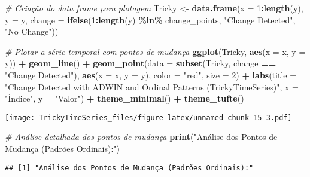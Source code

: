 \documentclass[
]{article}
\newenvironment{Shaded}{\begin{snugshade}}{\end{snugshade}}
\newcommand{\AttributeTok}[1]{\textcolor[rgb]{0.13,0.29,0.53}{#1}}
\newcommand{\CommentTok}[1]{\textcolor[rgb]{0.56,0.35,0.01}{\textit{#1}}}
\newcommand{\DecValTok}[1]{\textcolor[rgb]{0.00,0.00,0.81}{#1}}
\newcommand{\FunctionTok}[1]{\textcolor[rgb]{0.13,0.29,0.53}{\textbf{#1}}}
\newcommand{\NormalTok}[1]{#1}
\newcommand{\OtherTok}[1]{\textcolor[rgb]{0.56,0.35,0.01}{#1}}
\newcommand{\SpecialCharTok}[1]{\textcolor[rgb]{0.81,0.36,0.00}{\textbf{#1}}}
\newcommand{\StringTok}[1]{\textcolor[rgb]{0.31,0.60,0.02}{#1}}
\begin{document}
\begin{Shaded}
\begin{Highlighting}[]
\CommentTok{\# Criação do data frame para plotagem}
\NormalTok{Tricky }\OtherTok{\textless{}{-}} \FunctionTok{data.frame}\NormalTok{(}\AttributeTok{x =} \DecValTok{1}\SpecialCharTok{:}\FunctionTok{length}\NormalTok{(y), }\AttributeTok{y =}\NormalTok{ y, }\AttributeTok{change =} \FunctionTok{ifelse}\NormalTok{(}\DecValTok{1}\SpecialCharTok{:}\FunctionTok{length}\NormalTok{(y) }\SpecialCharTok{\%in\%}\NormalTok{ change\_points, }\StringTok{"Change Detected"}\NormalTok{, }\StringTok{"No Change"}\NormalTok{))}

\CommentTok{\# Plotar a série temporal com pontos de mudança}
\FunctionTok{ggplot}\NormalTok{(Tricky, }\FunctionTok{aes}\NormalTok{(}\AttributeTok{x =}\NormalTok{ x, }\AttributeTok{y =}\NormalTok{ y)) }\SpecialCharTok{+}
  \FunctionTok{geom\_line}\NormalTok{() }\SpecialCharTok{+}
  \FunctionTok{geom\_point}\NormalTok{(}\AttributeTok{data =} \FunctionTok{subset}\NormalTok{(Tricky, change }\SpecialCharTok{==} \StringTok{"Change Detected"}\NormalTok{), }\FunctionTok{aes}\NormalTok{(}\AttributeTok{x =}\NormalTok{ x, }\AttributeTok{y =}\NormalTok{ y), }\AttributeTok{color =} \StringTok{"red"}\NormalTok{, }\AttributeTok{size =} \DecValTok{2}\NormalTok{) }\SpecialCharTok{+}
  \FunctionTok{labs}\NormalTok{(}\AttributeTok{title =} \StringTok{"Change Detected with ADWIN and Ordinal Patterns (TrickyTimeSeries)"}\NormalTok{, }\AttributeTok{x =} \StringTok{"Índice"}\NormalTok{, }\AttributeTok{y =} \StringTok{"Valor"}\NormalTok{) }\SpecialCharTok{+}
  \FunctionTok{theme\_minimal}\NormalTok{() }\SpecialCharTok{+}
  \FunctionTok{theme\_tufte}\NormalTok{()}
\end{Highlighting}
\end{Shaded}

\texttt{[image: TrickyTimeSeries\_files/figure-latex/unnamed-chunk-15-3.pdf]}

\begin{Shaded}
\begin{Highlighting}[]
\CommentTok{\# Análise detalhada dos pontos de mudança}
\FunctionTok{print}\NormalTok{(}\StringTok{"Análise dos Pontos de Mudança (Padrões Ordinais):"}\NormalTok{)}
\end{Highlighting}
\end{Shaded}

\begin{verbatim}
## [1] "Análise dos Pontos de Mudança (Padrões Ordinais):"
\end{verbatim}
\end{document}
